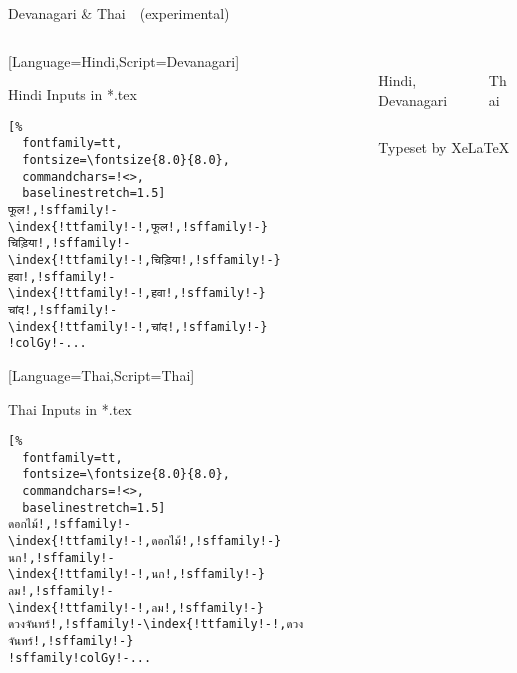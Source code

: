 \documentclass[aspectratio=169,10pt]{beamer}
\begin{document}
\setmonofont{Noto Sans Mono}
\begin{frame}[fragile]{Devanagari \& Thai~~{\scriptsize (experimental)}}

\begin{columns}
\begin{column}{50mm}

\setmonofont{Noto Serif Devanagari}[Language=Hindi,Script=Devanagari]
\setmainfont{Noto Sans Mono}
\setsansfont{Noto Sans}
\begin{exampleblock}{Hindi Inputs in *.tex}
\begin{Verbatim}[%
  fontfamily=tt,
  fontsize=\fontsize{8.0}{8.0},
  commandchars=!<>,
  baselinestretch=1.5]
फूल!,!sffamily!-\index{!ttfamily!-!,फूल!,!sffamily!-}
चिड़िया!,!sffamily!-\index{!ttfamily!-!,चिड़िया!,!sffamily!-}
हवा!,!sffamily!-\index{!ttfamily!-!,हवा!,!sffamily!-}
चांद!,!sffamily!-\index{!ttfamily!-!,चांद!,!sffamily!-}
!colGy!-...
\end{Verbatim}
\end{exampleblock}
\setmonofont{Noto Serif Thai}[Language=Thai,Script=Thai]
\setmainfont{Noto Sans Mono}
\setsansfont{Noto Sans}
\begin{exampleblock}{Thai Inputs in *.tex}
\begin{Verbatim}[%
  fontfamily=tt,
  fontsize=\fontsize{8.0}{8.0},
  commandchars=!<>,
  baselinestretch=1.5]
ดอกไม้!,!sffamily!-\index{!ttfamily!-!,ดอกไม้!,!sffamily!-}
นก!,!sffamily!-\index{!ttfamily!-!,นก!,!sffamily!-}
ลม!,!sffamily!-\index{!ttfamily!-!,ลม!,!sffamily!-}
ดวงจันทร์!,!sffamily!-\index{!ttfamily!-!,ดวงจันทร์!,!sffamily!-}
!sffamily!colGy!-...
\end{Verbatim}
\end{exampleblock}
\end{column}

\begin{column}{79mm}

\begin{columns}
\begin{column}{39mm}
\begin{center}
\\[2mm]%
Hindi, Devanagari
\end{center}
\end{column}

\begin{column}{39mm}
\begin{center}
\\[2mm]%
Thai
\end{center}
\end{column}
\end{columns}
\vspace{2mm}
\begin{center}
{\normalsize Typeset by XeLaTeX}
\end{center}
\end{column}

\end{columns}

\end{frame}
\end{document}
